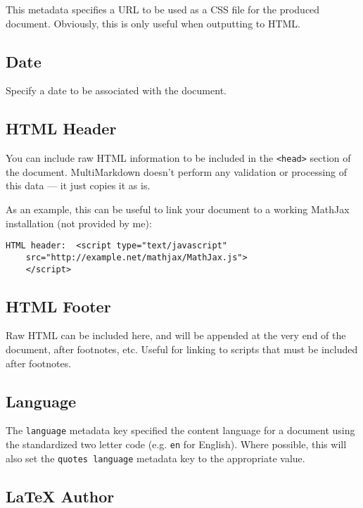 This metadata specifies a URL to be used as a CSS file for the produced
document. Obviously, this is only useful when outputting to HTML.

\subsection{Date }
\label{date}

Specify a date to be associated with the document.

\subsection{HTML Header }
\label{htmlheader}

You can include raw HTML information to be included in the \texttt{<head>} section of the document. MultiMarkdown doesn't perform any validation or processing of this data --- it just copies it as is.

As an example, this can be useful to link your document to a working MathJax
installation (not provided by me):

\begin{verbatim}
HTML header:  <script type="text/javascript"
	src="http://example.net/mathjax/MathJax.js">
	</script>
\end{verbatim}

\subsection{HTML Footer }
\label{htmlfooter}

Raw HTML can be included here, and will be appended at the very end of the document, after footnotes, etc. Useful for linking to scripts that must be included after footnotes.

\subsection{Language }
\label{language}

The \texttt{language} metadata key specified the content language for a document using the standardized two letter code (e.g. \texttt{en} for English). Where possible, this will also set the \texttt{quotes language} metadata key to the appropriate value.

\subsection{LaTeX Author }
\label{latexauthor}

